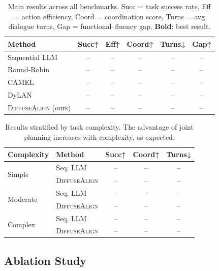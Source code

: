 \documentclass[11pt]{article}
\newcommand{\method}{\textsc{DiffuseAlign}}
\begin{document}
\begin{table}[t]
\centering
\small
\begin{tabular}{lccccc}
\toprule
\textbf{Method} & \textbf{Succ↑} & \textbf{Eff↑} & \textbf{Coord↑} & \textbf{Turns↓} & \textbf{Gap↑} \\
\midrule
Sequential LLM   & --  & --  & --  & --  & --  \\
Round-Robin       & --  & --  & --  & --  & --  \\
CAMEL             & --  & --  & --  & --  & --  \\
DyLAN             & --  & --  & --  & --  & --  \\
\midrule
\method{} (ours)  & --  & --  & --  & --  & --  \\
\bottomrule
\end{tabular}
\caption{Main results across all benchmarks. Succ = task success rate, Eff = action efficiency, Coord = coordination score, Turns = avg dialogue turns, Gap = functional--fluency gap. \textbf{Bold}: best result.}
\label{tab:main}
\end{table}

\begin{table}[t]
\centering
\small
\begin{tabular}{llccc}
\toprule
\textbf{Complexity} & \textbf{Method} & \textbf{Succ↑} & \textbf{Coord↑} & \textbf{Turns↓} \\
\midrule
\multirow{2}{*}{Simple}   & Seq. LLM       & --  & --  & -- \\
                           & \method{}      & --  & --  & -- \\
\midrule
\multirow{2}{*}{Moderate}  & Seq. LLM       & --  & --  & -- \\
                           & \method{}      & --  & --  & -- \\
\midrule
\multirow{2}{*}{Complex}   & Seq. LLM       & --  & --  & -- \\
                           & \method{}      & --  & --  & -- \\
\bottomrule
\end{tabular}
\caption{Results stratified by task complexity. The advantage of joint planning increases with complexity, as expected.}
\label{tab:complexity}
\end{table}

\subsection{Ablation Study}
\end{document}
